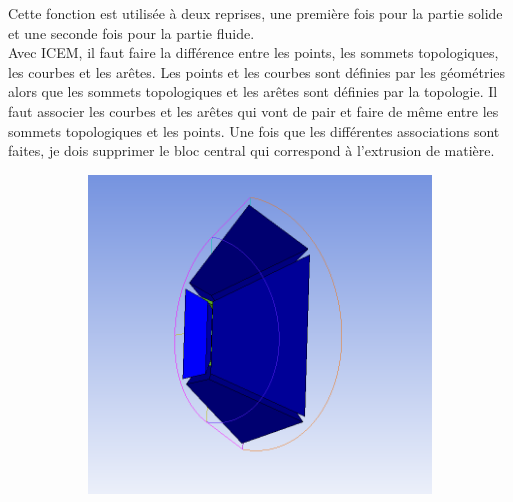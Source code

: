 Cette fonction est utilisée à deux reprises, une première fois pour la partie solide et une seconde fois pour la partie fluide.\\

Avec ICEM, il faut faire la différence entre les points, les sommets topologiques, les courbes et les arêtes. Les points et les courbes sont définies par les géométries alors que les sommets topologiques et les arêtes sont définies par la topologie. Il faut associer les courbes et les arêtes qui vont de pair et faire de même entre les sommets topologiques et les points. Une fois que les différentes associations sont faites, je dois supprimer le bloc central qui correspond à l'extrusion de matière.\\



\begin{figure}[H]
\begin{center}
\begin{subfigure}{0.5\textwidth}
\includegraphics[width=\textwidth]{chapter1_introduction/pictures/icem/castest_fluid_solid/blk1.PNG}
\label{fig:subim1}
\end{subfigure}
\begin{subfigure}{0.5\textwidth}

\end{subfigure}
\end{center}
\end{figure}
